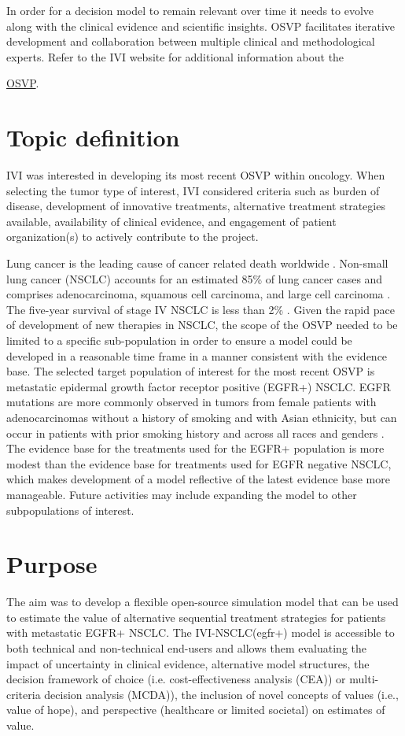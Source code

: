 \documentclass[11pt,final,fleqn]{article}\usepackage[]{graphicx}\usepackage[]{color}
\theoremstyle{plain}
\begin{document}
In order for a decision model to remain relevant over time it needs to evolve along with the clinical evidence and scientific insights. OSVP facilitates iterative development and collaboration between multiple clinical and methodological experts.
Refer to the IVI website for additional information about the {\href{https://www.thevalueinitiative.org/open-source-value-project/}{OSVP}.


\section{Topic definition}\label{sec:topic}
IVI was interested in developing its most recent OSVP within oncology. When selecting the tumor type of interest, IVI considered criteria such as burden of disease, development of innovative treatments, alternative treatment strategies available, availability of clinical evidence, and engagement of patient organization(s) to actively contribute to the project. 

Lung cancer is the leading cause of cancer related death worldwide \citep{jemal2011global}. Non-small lung cancer (NSCLC) accounts for an estimated 85\% of lung cancer cases and comprises adenocarcinoma, squamous cell carcinoma, and large cell carcinoma \citep{d2010metastatic}. The five-year survival of stage IV NSCLC is less than 2\% \citep{cetin2011survival}. Given the rapid pace of development of new therapies in NSCLC, the scope of the OSVP needed to be limited to a specific sub-population in order to ensure a model could be developed in a reasonable time frame in a manner consistent with the evidence base. The selected target population of interest for the most recent OSVP is metastatic epidermal growth factor receptor positive (EGFR+) NSCLC. EGFR mutations are more commonly observed in tumors from female patients with adenocarcinomas without a history of smoking and with Asian ethnicity, but can occur in patients with prior smoking history and across all races and genders \citep{lynch2004activating}. The evidence base for the treatments used for the EGFR+ population is more modest than the evidence base for treatments used for EGFR negative NSCLC, which makes development of a model reflective of the latest evidence base more manageable. Future activities may include expanding the model to other subpopulations of interest.


\section{Purpose}\label{sec:purpose}
The aim was to develop a flexible open-source simulation model that can be used to estimate the value of alternative sequential treatment strategies for patients with metastatic EGFR+ NSCLC. The IVI-NSCLC(egfr+) model is accessible to both technical and non-technical end-users and allows them evaluating the impact of uncertainty in clinical evidence, alternative model structures, the decision framework of choice (i.e. cost-effectiveness analysis (CEA)) or multi-criteria decision analysis (MCDA)), the inclusion of novel concepts of values (i.e., value of hope), and perspective (healthcare or limited societal) on estimates of value.

}
\end{document}

